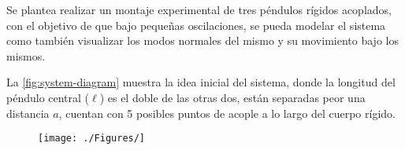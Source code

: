 
Se plantea realizar un montaje experimental de tres péndulos rígidos acoplados,
con el objetivo de que bajo pequeñas oscilaciones, se pueda modelar el sistema
como también visualizar los modos normales del mismo y su movimiento bajo los
mismos.

La \cref{fig:system-diagram} muestra la idea inicial del sistema,
donde la longitud del péndulo central (\( \ell \)) es el doble de las otras dos,
están separadas peor una distancia \( a \), cuentan con 5 posibles puntos de
acople a lo largo del cuerpo rígido.

\begin{figure}
	\centering
	\texttt{[image: ./Figures/]}
\caption{}
\label{fig:}
\end{figure}

